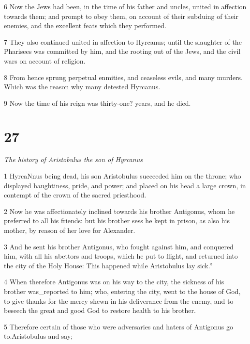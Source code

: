 \par 6 Now the Jews had been, in the time of his father and uncles, united in affection towards them; and prompt to obey them, on account of their subduing of their enemies, and the excellent feats which they performed. 

\par 7 They also continued united in affection to Hyrcanus; until the slaughter of the Pharisees was committed by him, and the rooting out of the Jews, and the civil wars on account of religion. 

\par 8 From hence sprung perpetual enmities, and ceaseless evils, and many murders. Which was the reason why many detested Hyrcanus. 

\par 9 Now the time of his reign was thirty-one? years, and he died. 

\chapter{27}

\par \textit{The history of Aristobulus the son of Hyrcanus}

\par 1 HyrcaNnus being dead, his son Aristobulus succeeded him on the throne; who displayed haughtiness, pride, and power; and placed on his head a large crown, in contempt of the crown of the sacred priesthood. 

\par 2 Now he was affectionately inclined towards his brother Antigonus, whom he preferred to all his friends: but his brother sess he kept in prison, as also his mother, by reason of her love for Alexander. 

\par 3 And he sent his brother Antigonus, who fought against him, and conquered him, with all his abettors and troops, which he put to flight, and returned into the city of the Holy House: This happened while Aristobulus lay sick.” 

\par 4 When therefore Antigonus was on his way to the city, the sickness of his brother was_reported to him; who, entering the city, went to the house of God, to give thanks for the mercy shewn in his deliverance from the enemy, and to beseech the great and good God to restore health to his brother. 

\par 5 Therefore certain of those who were adversaries and haters of Antigonus go to.Aristobulus and say; 

